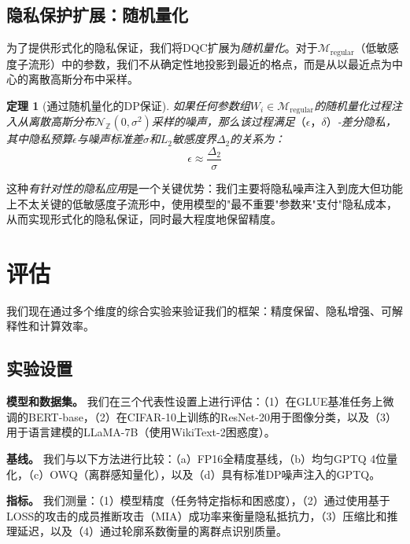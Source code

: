 \documentclass[letterpaper,twocolumn,10pt]{article}
\newtheorem{theorem}{定理}
\begin{document}
\subsection{隐私保护扩展：随机量化}

为了提供形式化的隐私保证，我们将DQC扩展为\emph{随机量化}。对于$\mathcal{M}_{\text{regular}}$（低敏感度子流形）中的参数，我们不从确定性地投影到最近的格点，而是从以最近点为中心的离散高斯分布中采样。

\begin{theorem}[通过随机量化的DP保证]
\label{thm:dp_guarantee}
如果任何参数组$W_i \in \mathcal{M}_{\text{regular}}$的随机量化过程注入从离散高斯分布$\mathcal{N}_{\mathbb{Z}}(0, \sigma^2)$采样的噪声，那么该过程满足$（\epsilon，\delta）$-差分隐私，其中隐私预算$\epsilon$与噪声标准差$\sigma$和$L_2$敏感度界$\Delta_2$的关系为：
\begin{equation}
\epsilon \approx \frac{\Delta_2}{\sigma}
\end{equation}
\end{theorem}

这种\emph{有针对性的隐私应用}是一个关键优势：我们主要将隐私噪声注入到庞大但功能上不太关键的低敏感度子流形中，使用模型的"最不重要"参数来"支付"隐私成本，从而实现形式化的隐私保证，同时最大程度地保留精度。

\section{评估}
\label{sec:evaluation}

我们现在通过多个维度的综合实验来验证我们的框架：精度保留、隐私增强、可解释性和计算效率。

\subsection{实验设置}

\textbf{模型和数据集。} 我们在三个代表性设置上进行评估：（1）在GLUE基准任务上微调的BERT-base，（2）在CIFAR-10上训练的ResNet-20用于图像分类，以及（3）用于语言建模的LLaMA-7B（使用WikiText-2困惑度）。

\textbf{基线。} 我们与以下方法进行比较：（a）FP16全精度基线，（b）均匀GPTQ 4位量化，（c）OWQ（离群感知量化），以及（d）具有标准DP噪声注入的GPTQ。

\textbf{指标。} 我们测量：（1）模型精度（任务特定指标和困惑度），（2）通过使用基于LOSS的攻击的成员推断攻击（MIA）成功率来衡量隐私抵抗力，（3）压缩比和推理延迟，以及（4）通过轮廓系数衡量的离群点识别质量。
\end{document}
